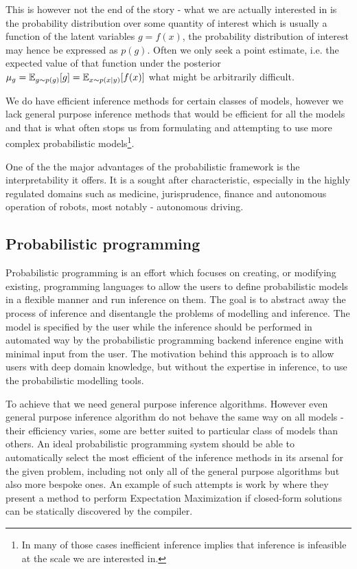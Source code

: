 \documentclass[12pt]{article}
\begin{document}
This is however not the end of the story - 
what we are actually interested in is the probability distribution over some quantity of interest which is usually a function of the latent variables $g=f(x)$, the probability distribution of interest may hence be expressed as $p(g)$.
Often we only seek a point estimate, i.e. the expected value of that function under the posterior $\mu_g=\mathbb{E}_{g \sim p(g)}[g]=\mathbb{E}_{x \sim p(x|y)}[f(x)]$ what might be arbitrarily difficult.

We do have efficient inference methods for certain classes of models, however we lack general purpose inference methods that would be efficient for all the models and that is what often stops us from formulating and attempting to use more complex probabilistic 
models\footnote{In many of those cases inefficient inference implies that inference is infeasible at the scale we are interested in.}.

One of the the major advantages of the probabilistic framework is the interpretability it offers.
It is a sought after characteristic, especially in the highly regulated domains such as medicine, jurisprudence, finance and autonomous operation of robots, most notably - autonomous driving.

\subsection{Probabilistic programming}
Probabilistic programming is an effort which focuses on creating, or modifying existing, programming languages to allow the users to define probabilistic models in a flexible manner and run inference on them.
The goal is to abstract away the process of inference and disentangle the problems of modelling and inference.
The model is specified by the user while the inference should be performed in automated way by the probabilistic programming backend inference engine with minimal input from the user.
The motivation behind this approach is to allow users with deep domain knowledge, but without the expertise in inference, to use the probabilistic modelling tools.


To achieve that we need general purpose inference algorithms.
However even general purpose inference algorithm do not behave the same way on all models - their efficiency varies, some are better suited to particular class of models than others.
An ideal probabilistic programming system should be able to automatically select the most efficient of the inference methods in its arsenal for the given problem, including not only all of the general purpose algorithms but also more bespoke ones.
An example of such attempts is work by \citet{ZinkovEM} where they present a method to perform Expectation Maximization \citep{EM} if closed-form solutions can be statically discovered by the compiler.
\end{document}
